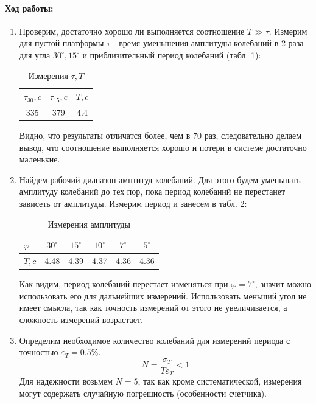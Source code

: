 \documentclass[a4paper, 10pt]{article}%
\begin{document}
	\paragraph{Ход работы:}
	\begin{enumerate}
		\item Проверим, достаточно хорошо ли выполняется соотношение $T \gg \tau$. Измерим для пустой платформы $\tau$ - время уменьшения амплитуды колебаний в 2 раза для угла $30^\circ, 15^\circ$ и приблизительный период колебаний (табл. 1):
		
		\begin{table}[h]
			\centering
			\caption{Измерения $\tau, T$}
			\begin{tabular}{|c|c|c|}
				\hline
				$\tau_{30}, c$ & $\tau_{15}, c$ & $T, c$ \\
				\hline
				335 & 379 & 4.4 \\
				\hline
			\end{tabular}
		\end{table}
		Видно, что результаты отличатся более, чем в 70 раз, следовательно делаем вывод, что соотношение выполняется хорошо и потери в системе достаточно маленькие.
		\item Найдем рабочий диапазон амптитуд колебаний. Для этого будем уменьшать амплитуду колебаний до тех пор, пока период колебаний не перестанет зависеть от амплитуды. Измерим период и занесем в табл. 2:
		
		\begin{table}[h]
			\centering
			\caption{Измерения амплитуды}
			\begin{tabular}{|l|c|c|c|c|c|}
				\hline
				$\varphi$ & $30^\circ$ & $15^\circ$ & $10^\circ$ & $7^\circ$ & $5^\circ$ \\
				\hline
				$T, c$ & 4.48 & 4.39 & 4.37 & 4.36 & 4.36 \\
				\hline
			\end{tabular}
		\end{table}
		
		Как видим, период колебаний перестает изменяться при $\varphi = 7^\circ$, значит можно использовать его для дальнейших измерений. Использовать меньший угол не имеет смысла, так как точность измерений от этого не увеличивается, а сложность измерений возрастает.
		
		\item Определим необходимое количество колебаний для измерений периода с точностью $\varepsilon_T = 0.5\%$.
		\[N = \dfrac{\sigma_T}{T\varepsilon_T} < 1\]
		Для надежности возьмем $N = 5$, так как кроме систематической, измерения могут содержать случайную погрешность (особенности счетчика).


\end{enumerate}
\end{document}
